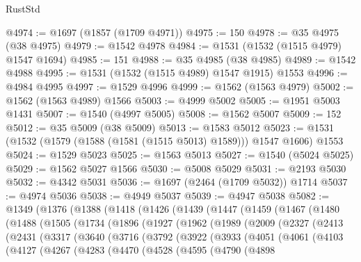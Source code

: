 \begin{lexlean}{RustStd}
\begin{coremodule}
{\begin{coremodule}
{{{{{{{{{{{{{{{{{{{{{{{{{{{{{{{{@4974 := @1697 (@1857 (@1709 @4971))
@4975 := 150
@4978 := @35 @4975 (@38 @4975)
@4979 := @1542 @4978
@4984 := @1531 (@1532 (@1515 @4979) @1547 @1694)
@4985 := 151
@4988 := @35 @4985 (@38 @4985)
@4989 := @1542 @4988
@4995 := @1531 (@1532 (@1515 @4989) @1547 @1915) @1553
@4996 := @4984 @4995
@4997 := @1529 @4996
@4999 := @1562 (@1563 @4979)
@5002 := @1562 (@1563 @4989) @1566
@5003 := @4999 @5002
@5005 := @1951 @5003 @1431
@5007 := @1540 (@4997 @5005)
@5008 := @1562 @5007
@5009 := 152
@5012 := @35 @5009 (@38 @5009)
@5013 := @1583 @5012
@5023 := @1531 (@1532 (@1579 (@1588 (@1581 (@1515 @5013) @1589))) @1547 @1606) @1553
@5024 := @1529 @5023
@5025 := @1563 @5013
@5027 := @1540 (@5024 @5025)
@5029 := @1562 @5027 @1566
@5030 := @5008 @5029
@5031 := @2193 @5030
@5032 := @4342 @5031
@5036 := @1697 (@2464 (@1709 @5032)) @1714
@5037 := @4974 @5036
@5038 := @4949 @5037
@5039 := @4947 @5038
@5082 := @1349
    (@1376
      (@1388
        (@1418
          (@1426
            (@1439
              (@1447
                (@1459
                  (@1467
                    (@1480
                      (@1488
                        (@1505
                          (@1734
                            (@1896
                              (@1927
                                (@1962
                                  (@1989
                                    (@2009
                                      (@2327
                                        (@2413
                                          (@2431
                                            (@3317
                                              (@3640
                                                (@3716
                                                  (@3792
                                                    (@3922
                                                      (@3933
                                                        (@4051
                                                          (@4061
                                                            (@4103
                                                              (@4127
                                                                (@4267
                                                                  (@4283
                                                                    (@4470
                                                                      (@4528
                                                                        (@4595
                                                                          (@4790
                                                                            (@4898
}}}}}}}}}}}}}}}}}}}}}}}}}}}}}}}}
\end{coremodule}}
\end{coremodule}
\end{lexlean}
